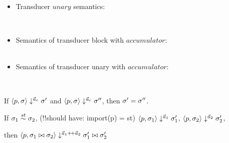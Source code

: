 \begin{itemize}
\\[2ex]

\\[2ex]


\item Transducer $unary$ semantics:\\ 


\PT{ \Axiom{\usum(\oF) \da \singl\unit}}
\PT{\Axiom{\usum(\oT) \da \emptyv }} \\[1ex]


\item Semantics of transducer block with $accumulator$: \\

\\[2ex]


\item Semantics of transducer unary with $accumulator$: \\


 \\




\end{itemize}


\begin{thm}
	\label{thm-svcode-determ}
	If $\langle p,\sigma \rangle \downarrow^{\vec a_c} \sigma'$ and $\langle p,\sigma \rangle \downarrow^{\vec a_c} \sigma''$, 
	then $\sigma' = \sigma''$.
\end{thm}


\begin{lem}[??] \label{lem-sgm-join}
	If $\sigma_1 \stackrel{\mathit{st}}{\sim} \sigma_2$, (!!should have: import(p) = st)
	$\langle p,\sigma_1 \rangle \downarrow^{\vec a_1} \sigma_1'$, 
	$\langle p,\sigma_2 \rangle \downarrow^{\vec a_2} \sigma_2'$,
	
	then $\seval{p}{\sgm_1 \x{} \sgm_2}{\a_1 \++ \a_2}{\sgm_1' \x{} \sgm_2'}$
\end{lem}


